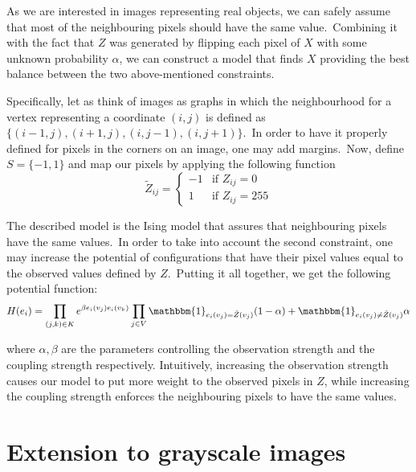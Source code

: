 \documentclass[a4paper, 11pt, onecolumn, openany, titlepage]{report}
\theoremstyle{default_theorem_style}\newtheorem{theorem}{Theorem}
\theoremstyle{default_theorem_style}\newtheorem{definition}{Definition}
\begin{document}
As we are interested in images representing real objects, we can safely assume that most of the neighbouring pixels
should have the same value.\ Combining it with the fact that $Z$ was generated by flipping each pixel of $X$ with some
unknown probability $\alpha$, we can construct a model that finds $X$ providing the best balance between the
two above-mentioned constraints.\newline

Specifically, let as think of images as graphs in which the neighbourhood for a
vertex representing a coordinate $(i, j)$ is defined as $\{(i - 1, j), (i + 1, j), (i, j - 1), (i, j + 1)\}$.\ In
order to have it properly defined for pixels in the corners on an image, one may add margins.\ Now, define
$S = \{-1, 1\}$ and map our pixels by applying the following function
$$
\tilde{Z}_{ij} =
\begin{cases}
  -1 &\text{if $Z_{ij} = 0$}\\
  1 &\text{if $Z_{ij} = 255$}
\end{cases}
$$

The described model is the Ising model that assures that neighbouring pixels have the same values.\ In order to
take into account the second constraint, one may increase the potential of configurations that have their pixel values
equal to the observed values defined by $Z$.\ Putting it all together, we get the following potential function:
$$
H(e_i) = \prod\limits_{(j, k) \in K} e^{\beta e_i(v_j)e_i(v_k)}
\prod\limits_{j \in V} \mathbbm{1}_{e_i(v_j) = \tilde{Z}(v_j)}(1 - \alpha) +
\mathbbm{1}_{e_i(v_j) \neq \tilde{Z}(v_j)}\alpha
$$

where $\alpha, \beta$ are the parameters controlling the observation strength and the coupling strength respectively.
Intuitively, increasing the observation strength causes our model to put more weight to the observed pixels in $Z$,
while increasing the coupling strength enforces the neighbouring pixels to have the same values.

\section{Extension to grayscale images}
\end{document}
